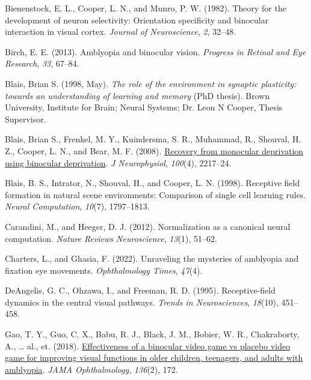 \documentclass[
  onecolumn]{article}
\newlength{\cslhangindent}
\newenvironment{CSLReferences}[2] %
 {%
  \setlength{\parindent}{0pt}
  \ifodd #1 \everypar{\setlength{\hangindent}{\cslhangindent}}\ignorespaces\fi
  \ifnum #2 > 0
  \setlength{\parskip}{#2\baselineskip}
  \fi
 }%
 {}
\begin{document}
\hypertarget{refs}{}
\begin{CSLReferences}{1}{0}
\leavevmode{}%
Bienenstock, E. L., Cooper, L. N., and Munro, P. W. (1982). Theory for
the development of neuron selectivity: Orientation specificity and
binocular interaction in visual cortex. \emph{Journal of Neuroscience},
\emph{2}, 32--48.

\leavevmode{}%
Birch, E. E. (2013). Amblyopia and binocular vision. \emph{Progress in
Retinal and Eye Research}, \emph{33}, 67--84.

\leavevmode{}%
Blais, Brian S. (1998, May). \emph{The role of the environment in
synaptic plasticity:\\
towards an understanding of learning and memory} (PhD thesis). Brown
University, Institute for Brain; Neural Systems; Dr. Leon N Cooper,
Thesis Supervisor.

\leavevmode{}%
Blais, Brian S., Frenkel, M. Y., Kuindersma, S. R., Muhammad, R.,
Shouval, H. Z., Cooper, L. N., and Bear, M. F. (2008).
\href{https://doi.org/10.1152/jn.90411.2008}{Recovery from monocular
deprivation using binocular deprivation}. \emph{J Neurophysiol},
\emph{100}(4), 2217--24.

\leavevmode{}%
Blais, B. S., Intrator, N., Shouval, H., and Cooper, L. N. (1998).
Receptive field formation in natural scene environments: Comparison of
single cell learning rules. \emph{Neural Computation}, \emph{10}(7),
1797--1813.

\leavevmode{}%
Carandini, M., and Heeger, D. J. (2012). Normalization as a canonical
neural computation. \emph{Nature Reviews Neuroscience}, \emph{13}(1),
51--62.

\leavevmode{}%
Charters, L., and Ghasia, F. (2022). Unraveling the mysteries of
amblyopia and fixation eye movements. \emph{Ophthalmology Times},
\emph{47}(4).

\leavevmode{}%
DeAngelis, G. C., Ohzawa, I., and Freeman, R. D. (1995). Receptive-field
dynamics in the central visual pathways. \emph{Trends in Neurosciences},
\emph{18}(10), 451--458.

\leavevmode{}%
Gao, T. Y., Guo, C. X., Babu, R. J., Black, J. M., Bobier, W. R.,
Chakraborty, A., \ldots{} al., et. (2018).
\href{https://doi.org/10.1001/jamaophthalmol.2017.6090}{Effectiveness of
a binocular video game vs placebo video game for improving visual
functions in older children, teenagers, and adults with amblyopia}.
\emph{JAMA Ophthalmology}, \emph{136}(2), 172.


\end{CSLReferences}
\end{document}
